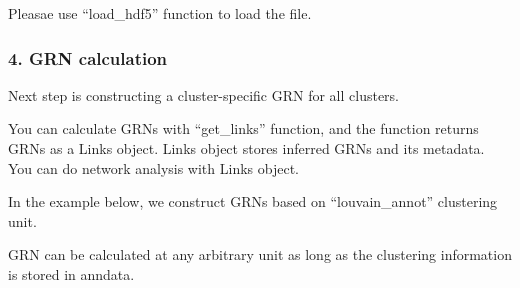 \documentclass[letterpaper,10pt,english]{sphinxmanual}
\begin{document}
Pleasae use “load\_hdf5” function to load the file.

{
%
\begin{sphinxVerbatim}[commandchars=\\\{\}]
\llap{\color{nbsphinxin}[23]:\,\hspace{\fboxrule}\hspace{\fboxsep}}
\end{sphinxVerbatim}
}

{
%
\begin{sphinxVerbatim}[commandchars=\\\{\}]
\llap{\color{nbsphinxin}[24]:\,\hspace{\fboxrule}\hspace{\fboxsep}}
\end{sphinxVerbatim}
}


\subsubsection{4. GRN calculation}
\label{\detokenize{notebooks/04_Network_analysis/Network_analysis_with_with_Paul_etal_2015_data:4.-GRN-calculation}}
Next step is constructing a cluster-specific GRN for all clusters.

You can calculate GRNs with “get\_links” function, and the function returns GRNs as a Links object. Links object stores inferred GRNs and its metadata. You can do network analysis with Links object.

In the example below, we construct GRNs based on “louvain\_annot” clustering unit.

GRN can be calculated at any arbitrary unit as long as the clustering information is stored in anndata.

{
%
\begin{sphinxVerbatim}[commandchars=\\\{\}]
\llap{\color{nbsphinxin}[43]:\,\hspace{\fboxrule}\hspace{\fboxsep}}
 
\end{sphinxVerbatim}
}
\end{document}
